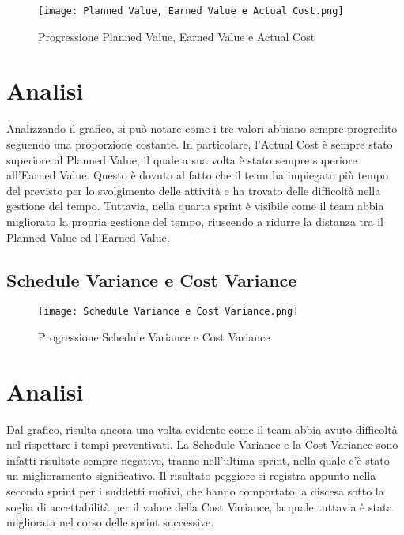 \begin{figure}[h] 
    \centering
    \texttt{[image: Planned Value, Earned Value e Actual Cost.png]}
    \caption{Progressione Planned Value, Earned Value e Actual Cost} 
    \label{fig: Planned Value, Earned Value e Actual Cost}
\end{figure}

\section*{Analisi}

Analizzando il grafico, si può notare come i tre valori abbiano sempre progredito seguendo una
proporzione costante. In particolare, l’Actual Cost è sempre stato superiore al Planned Value,
il quale a sua volta è stato sempre superiore all’Earned Value. Questo è dovuto al fatto che
il team ha impiegato più tempo del previsto per lo svolgimento delle attività e ha trovato
delle difficoltà nella gestione del tempo. Tuttavia, nella quarta sprint è visibile come il team
abbia migliorato la propria gestione del tempo, riuscendo a ridurre la distanza tra il Planned Value
ed l'Earned Value.

\newpage

\subsection{Schedule Variance e Cost Variance}
\label{subsec:Schedule Variance e Cost Variance}

\begin{figure}[h] 
    \centering
    \texttt{[image: Schedule Variance e Cost Variance.png]}
    \caption{Progressione Schedule Variance e Cost Variance} 
    \label{fig: Schedule Variance e Cost Variance}
\end{figure}

\section*{Analisi}

Dal grafico, risulta ancora una volta evidente come il team abbia avuto difficoltà nel
rispettare i tempi preventivati. La Schedule Variance e la Cost Variance sono infatti
risultate sempre negative, tranne nell'ultima sprint, nella quale c'è stato un miglioramento
significativo. Il risultato peggiore si registra appunto nella seconda sprint per i suddetti
motivi, che hanno comportato la discesa sotto la soglia di accettabilità per il valore della
Cost Variance, la quale tuttavia è stata migliorata nel corso delle sprint successive.

